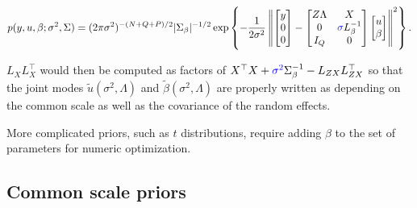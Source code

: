 \documentclass[article,shortnames]{jss}
\begin{document}
\begin{equation*}
  p(y, u, \beta; \sigma^2, \Sigma) = (2\pi\sigma^2)^{-(N+Q+P)/2}
  |\Sigma_\beta|^{-1/2}
  \exp\left\{-\frac{1}{2\sigma^2}\left\|
      \begin{bmatrix} y \\ 0 \\ 0 \end{bmatrix} - 
      \begin{bmatrix} Z\Lambda & X \\ 0 & {\color{blue}\sigma}L_\beta^{-1} \\
        I_Q & 0 \end{bmatrix}
      \begin{bmatrix} u \\ \beta \end{bmatrix}
    \right\|^2\right\}.
\end{equation*}

$L_XL_X^\top$ would then be computed as factors of $X^\top X + {\color{blue}
  \sigma^2}\Sigma_\beta^{-1} - L_{ZX}L_{ZX}^\top$ so that the joint
modes $\tilde{u}(\sigma^2, \Lambda)$ and $\tilde{\beta}(\sigma^2, \Lambda)$ are properly
written as depending on the common scale as well as the covariance of
the random effects.

More complicated priors, such as $t$ distributions, require adding
$\beta$ to the set of parameters for numeric optimization.

\subsection{Common scale priors}
\label{sec:bmath:residPrior}
\end{document}
